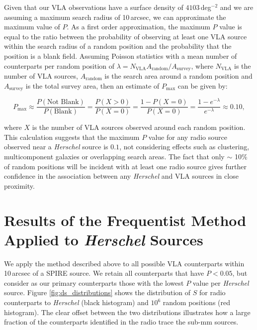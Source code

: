 Given that our VLA observations have a surface density of $4103\,$deg$^{-2}$ and we are assuming a maximum search radius of 10\,arcsec, we can approximate the maximum value of $P$. As a first order approximation, the maximum $P$ value is equal to the ratio between the probability of observing at least one VLA source within the search radius of a random position and the probability that the position is a blank field. Assuming Poisson statistics with a mean number of counterparts per random position of $\lambda = N_{\textrm{VLA}}A_{\textrm{random}}/A_{\textrm{survey}}$, where $N_{\textrm{VLA}}$ is the number of VLA sources, $A_{\textrm{random}}$ is the search area around a random position and $A_{\textrm{survey}}$ is the total survey area, then an estimate of $P_{\textrm{max}}$ can be given by:

\begin{equation}
    P_{\textrm{max}} \approx \frac{P(\textrm{Not Blank})}{P(\textrm{Blank})} = \frac{P(X > 0)}{P(X = 0)} = \frac{1 - P(X = 0)}{P(X = 0)} = \frac{1 - e^{-\lambda}}{e^{-\lambda}} \approx 0.10,
\end{equation}

\noindent where $X$ is the number of VLA sources observed around each random position. This calculation suggests that the maximum $P$ value for any radio source observed near a \textit{Herschel} source is $0.1$, not considering effects such as clustering, multicomponent galaxies or overlapping search areas. The fact that only $\sim$ 10\% of random positions will be incident with at least one radio source gives further confidence in the association between any \textit{Herschel} and VLA sources in close proximity.

\section{Results of the Frequentist Method Applied to \textit{Herschel} Sources}

We apply the method described above to all possible VLA counterparts within 10\,arcsec of a SPIRE source. We retain all counterparts that have $P < 0.05$, but consider as our primary counterparts those with the lowest $P$ value per \textit{Herschel} source. Figure \ref{fig:ds_distributions} shows the distribution of $S$ for radio counterparts to \textit{Herschel} (black histogram) and $10^6$ random positions (red histogram). The clear offset between the two distributions illustrates how a large fraction of the counterparts identified in the radio trace the sub-mm sources.

